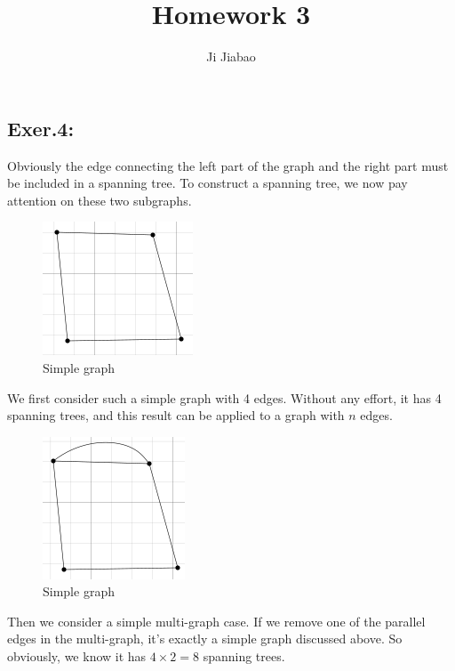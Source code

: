 \documentclass[UTF8]{ctexart}
\begin{document}
 

\title{Homework 3}
\author{Ji Jiabao}
\maketitle

\subsection*{Exer.4:}
    Obviously the edge connecting the left part of the graph and the right part must be included
    in a spanning tree. To construct a spanning tree, we now pay attention on these two subgraphs.

    \begin{figure}[h]
        \centering
        \includegraphics[scale = 0.5]{./figs/simple_graph.png}
        \caption{Simple graph}
    \end{figure}
    We first consider such a simple graph with 4 edges. Without any effort, 
    it has 4 spanning trees, and this result can be applied to a graph with $n$ edges.

    \begin{figure}[h]
        \centering
        \includegraphics[scale = 0.5]{./figs/simple_multigraph.png}
        \caption{Simple graph}
    \end{figure}
    Then we consider a simple multi-graph case. If we remove one of the parallel edges in the 
    multi-graph, it's exactly a simple graph discussed above. So obviously, we know it has $4 \times 2 = 8$
    spanning trees.
\end{document}
